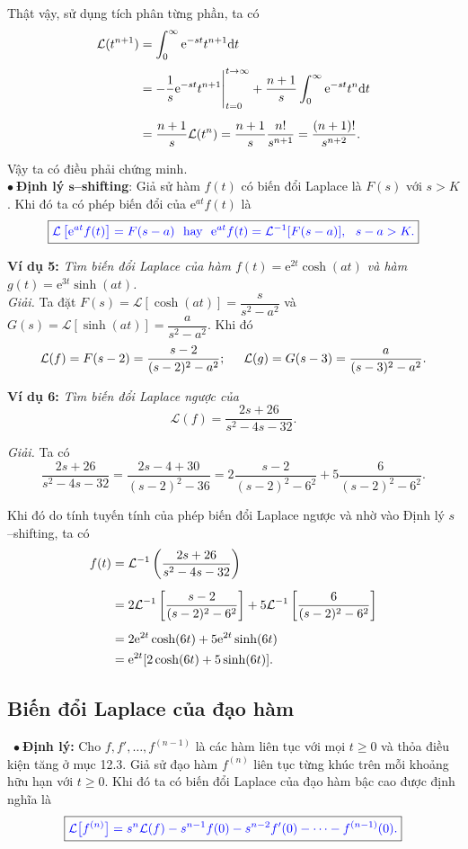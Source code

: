 \documentclass[10pt, a4paper]{article}
\begin{document}
	Thật vậy, sử dụng tích phân từng phần, ta có \begin{align*}
		\mathcal L(t^{n+1})&=\int_0^\infty\mathrm e^{-st}t^{n+1}\mathrm dt\\
		\noalign{\vskip3pt}
		&=-\frac1s\mathrm e^{-st}t^{n+1}\Bigg|_{t=0}^{t\to\infty}+\frac{n+1}{s}\int_0^\infty\mathrm e^{-st}t^n\mathrm dt\\
		\noalign{\vskip5pt}
		&=\frac{n+1}{s}\mathcal L(t^n)=\frac{n+1}{s}\frac{n!}{s^{n+1}}=\frac{(n+1)!}{s^{n+2}}.
	\end{align*}
	
	Vậy ta có điều phải chứng minh.\\
	
	$\bullet~$\textbf{Định lý $\mathbf s$--shifting}: Giả sử hàm $f(t)$ có biến đổi Laplace là $F(s)$ với $s>K$. Khi đó ta có phép biến đổi của $\mathrm e^{at}f(t)$ là $$\boxed{\color{blue}\mathcal L\left[\mathrm e^{at}f(t)\right]=F(s-a)~~\text{hay}~~\mathrm e^{at}f(t)=\mathcal L^{-1}[F(s-a)],~~s-a>K.}$$
	
	\textbf{Ví dụ 5:} \textit{Tìm biến đổi Laplace của hàm $f(t)=\mathrm e^{2t}\cosh(at)$ và hàm $g(t)=\mathrm e^{3t}\sinh(at)$.}\\
	
	\textit{Giải.} Ta đặt $F(s)=\mathcal L[\cosh(at)]=\dfrac{s}{s^2-a^2}$ và $G(s)=\mathcal L[\sinh(at)]=\dfrac{a}{s^2-a^2}$. Khi đó $$\mathcal L(f)=F(s-2)=\frac{s-2}{(s-2)^2-a^2};\hspace{0.5cm}\mathcal L(g)=G(s-3)=\dfrac{a}{(s-3)^2-a^2}.$$
	
	\textbf{Ví dụ 6:} \textit{Tìm biến đổi Laplace ngược của} $$\mathcal L(f)=\frac{2s+26}{s^2-4s-32}.$$
	
	\textit{Giải.} Ta có $$\frac{2s+26}{s^2-4s-32}=\frac{2s-4+30}{(s-2)^2-36}=2\frac{s-2}{(s-2)^2-6^2}+5\frac{6}{(s-2)^2-6^2}.$$
	
	Khi đó do tính tuyến tính của phép biến đổi Laplace ngược và nhờ vào Định lý $s$--shifting, ta có \begin{align*}
		f(t)&=\mathcal L^{-1}\left(\frac{2s+26}{s^2-4s-32}\right)\\
		\noalign{\vskip5pt}
		&=2\mathcal L^{-1}\left[\frac{s-2}{(s-2)^2-6^2}\right]+5\mathcal L^{-1}\left[\frac{6}{(s-2)^2-6^2}\right]\\
		\noalign{\vskip5pt}
		&=2\mathrm e^{2t}\cosh(6t)+5\mathrm e^{2t}\sinh(6t)\\
		&=\mathrm e^{2t}[2\cosh(6t)+5\sinh(6t)].
	\end{align*}
	\subsection{Biến đổi Laplace của đạo hàm}
	\quad\,\,\,$\bullet~$\textbf{Định lý:} Cho $f,f',\ldots,f^{(n-1)}$ là các hàm liên tục với mọi $t\ge0$ và thỏa điều kiện tăng ở mục 12.3. Giả sử đạo hàm $f^{(n)}$ liên tục từng khúc trên mỗi khoảng hữu hạn với $t\ge0$. Khi đó ta có biến đổi Laplace của đạo hàm bậc cao được định nghĩa là $$\boxed{\color{blue}\mathcal L\big[f^{(n)}\big]=s^n\mathcal L(f)-s^{n-1}f(0)-s^{n-2}f'(0)-\cdots-f^{(n-1)}(0).}$$
	
\end{document}
